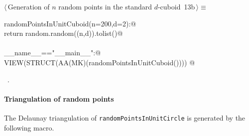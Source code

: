 \documentclass[11pt,oneside]{article}	%
\begin{document}
\begin{flushleft} \small \label{scrap24}
\protect{}$\langle\,$Generation of $n$ random points in the standard $d$-cuboid\nobreak\ {\footnotesize 13b}$\,\rangle\equiv$
\vspace{-1ex}
\begin{list}{}{} \item
\mbox{}\verb@def randomPointsInUnitCuboid(n=200,d=2):@\\
\mbox{}\verb@   return random.random((n,d)).tolist()@\\
\mbox{}\verb@@\\
\mbox{}\verb@if __name__=="__main__":@\\
\mbox{}\verb@   VIEW(STRUCT(AA(MK)(randomPointsInUnitCuboid()))) @\\
\mbox{}\verb@@{\NWsep}
\end{list}
\vspace{-1ex}
\footnotesize\addtolength{\baselineskip}{-1ex}
\begin{list}{}{\setlength{\itemsep}{-\parsep}\setlength{\itemindent}{-\leftmargin}}
\item \NWtxtMacroRefIn\ .
\end{list}
\end{flushleft}



\paragraph{Triangulation of random points} The Delaunay triangulation of \texttt{randomPointsInUnitCircle} is generated by the following macro.
\end{document}
